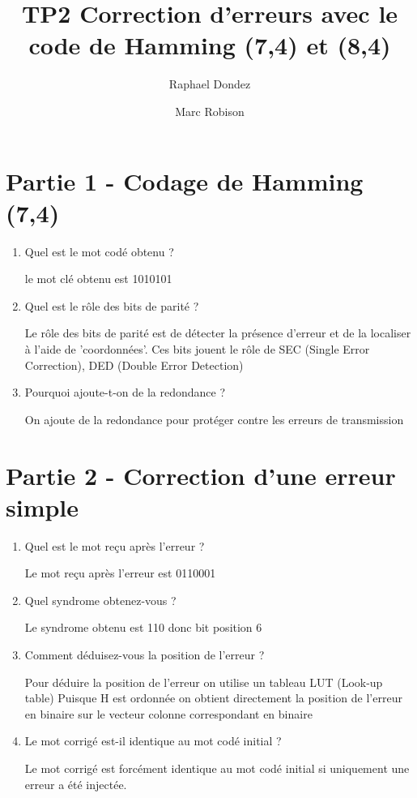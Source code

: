 \documentclass{article}
\begin{document}
\title{TP2 Correction d'erreurs avec le code de Hamming (7,4) et (8,4)}
\author{Raphael Dondez \and Marc Robison}
\maketitle

\section{Partie 1 - Codage de Hamming (7,4)}
\begin{enumerate}
\item Quel est le mot codé obtenu ?

le mot clé obtenu est 1010101
\item Quel est le rôle des bits de parité ?

Le rôle des bits de parité est de détecter la présence d'erreur et de la localiser à l'aide de 'coordonnées'.
Ces bits jouent le rôle de SEC (Single Error Correction), DED (Double Error Detection)

\item Pourquoi ajoute-t-on de la redondance ?

On ajoute de la redondance pour protéger contre les erreurs de transmission
\end{enumerate}
\section{Partie 2 - Correction d'une erreur simple}
\begin{enumerate}
\item Quel est le mot reçu après l'erreur ? 

Le mot reçu après l'erreur est 0110001
\item Quel syndrome obtenez-vous ? 

Le syndrome obtenu est 110 donc bit position 6
\item Comment déduisez-vous la position de l’erreur ? 

Pour déduire la position de l'erreur on utilise un tableau LUT (Look-up table)
Puisque H est ordonnée on obtient directement la position de l'erreur en binaire
sur le vecteur colonne correspondant en binaire
\item Le mot corrigé est-il identique au mot codé initial ? 

Le mot corrigé est forcément identique au mot codé initial si uniquement une erreur
a été injectée.
\end{enumerate}
\end{document}
